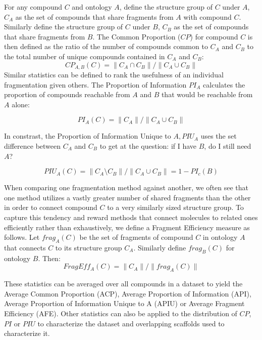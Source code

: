 \documentclass[journal=jacsat,manuscript=article]{achemso}
\begin{document}
For any compound $C$ and ontology $A$, define the structure group of
$C$ under $A$, $C_A$ as the set of compounds that share fragments from
$A$ with compound $C$. Similarly define the structure group of $C$
under $B$, $C_B$ as the set of compounds that share fragments from
$B$. The Common Proportion ($CP$) for compound $C$ is then defined as
the ratio of the number of compounds common to $C_A$ and $C_B$ to the
total number of unique compounds contained in $C_A$ and $C_B$:
\begin{equation}
CP_{A,B}(C) = \| C_A \cap C_B \| / \| C_A \cup C_B \|
\end{equation}
Similar statistics can be defined to rank the usefulness of an
individual fragmentation given others. The Proportion of Information
$PI_A$ calculates the proportion of compounds reachable from $A$ and
$B$ that would be reachable from $A$ alone:

\begin{equation}
PI_A(C) = \| C_A \| / \| C_A \cup C_B \|
\end{equation}

In constrast, the Proportion of Information Unique to $A, PIU_A$ uses the set difference between $C_A$ and $C_B$ to get at the question: if I have $B$, do I still need $A$? 

\begin{equation}
 PIU_A(C) = \| C_A \setminus C_B \| / \| C_A \cup C_B \| = 1 - PI_c(B)
 \end{equation}
  
When comparing one fragmentation method against another, we often see that one method utilizes a vastly greater number of shared fragments than the other in order to connect compound $C$ to a very similarly sized structure group. To capture this tendency and reward methods that connect molecules to related ones efficiently rather than exhaustively, we define a Fragment Efficiency measure as follows. Let $frag_A(C)$ be the set of fragments of compound $C$ in ontology $A$ that connects $C$ to its structure group $C_A$. Similarly define $frag_B(C)$ for ontology $B$. Then: 
\begin{equation}
FragEff_A(C) = \| C_A \| / \| frag_A(C) \|
\end{equation}


These statistics can be averaged over all compounds in a dataset to yield the Average Common Proportion (ACP), Average Proportion of Information (API), Average Proportion of Information Unique to A (APIU) or Average Fragment Efficiency (AFE).  Other statistics can also be applied to the distribution of $CP$, $PI$ or $PIU$ to characterize the dataset and overlapping scaffolds used to characterize it.
\end{document}
